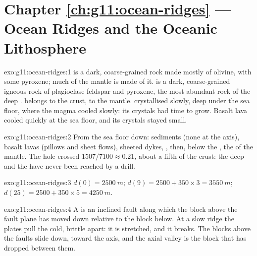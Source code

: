 \section*{Chapter \ref{ch:g11:ocean-ridges} --- Ocean Ridges and the Oceanic Lithosphere}

\begin{solution}{exo:g11:ocean-ridges:1}
 is a dark, coarse-grained rock made mostly of olivine, with some
pyroxene; much of the mantle is made of it.  is a dark, coarse-grained
igneous rock of plagioclase feldspar and pyroxene, the most abundant rock of
the deep .  belongs to the crust,  to the mantle.
 crystallised slowly, deep under the sea floor, where the magma cooled
slowly: its crystals had time to grow. Basalt lava cooled quickly at the sea
floor, and its crystals stayed small.
\end{solution}

\begin{solution}{exo:g11:ocean-ridges:2}
From the sea floor down: sediments (none at the axis), basalt lavas (pillows
and sheet flows), sheeted dykes, , then, below the , the 
of the mantle. The hole crossed $1507/7100 \approx 0.21$, about a fifth of
the crust: the deep  and the  have never been reached by a drill.
\end{solution}

\begin{solution}{exo:g11:ocean-ridges:3}
$d(0) = \qty{2500}{m}$; $d(9) = 2500 + 350 \times 3 = \qty{3550}{m}$;
$d(25) = 2500 + 350 \times 5 = \qty{4250}{m}$.
\end{solution}

\begin{solution}{exo:g11:ocean-ridges:4}
A  is an inclined fault along which the block above the fault
plane has moved down relative to the block below. At a slow ridge the plates
pull the cold, brittle  apart: it is stretched, and it breaks. The
blocks above the faults slide down, toward the axis, and the axial valley is
the block that has dropped between them.
\end{solution}

